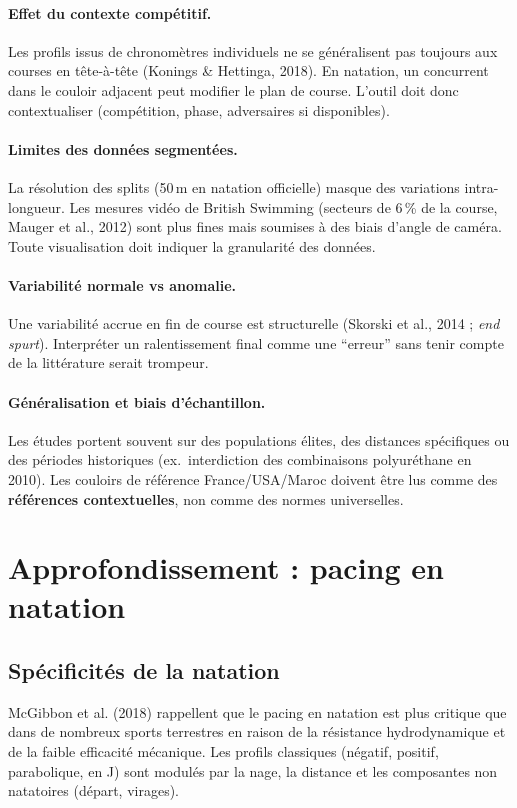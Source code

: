\documentclass[11pt,a4paper]{article}
\begin{document}
\paragraph{Effet du contexte compétitif.}
Les profils issus de chronomètres individuels ne se généralisent pas toujours aux courses en tête-à-tête (Konings \& Hettinga, 2018). En natation, un concurrent dans le couloir adjacent peut modifier le plan de course. L'outil doit donc contextualiser (compétition, phase, adversaires si disponibles).

\paragraph{Limites des données segmentées.}
La résolution des splits (50\,m en natation officielle) masque des variations intra-longueur. Les mesures vidéo de British Swimming (secteurs de 6\,\% de la course, Mauger et al., 2012) sont plus fines mais soumises à des biais d'angle de caméra. Toute visualisation doit indiquer la granularité des données.

\paragraph{Variabilité normale vs anomalie.}
Une variabilité accrue en fin de course est structurelle (Skorski et al., 2014 ; \textit{end spurt}). Interpréter un ralentissement final comme une ``erreur'' sans tenir compte de la littérature serait trompeur.

\paragraph{Généralisation et biais d'échantillon.}
Les études portent souvent sur des populations élites, des distances spécifiques ou des périodes historiques (ex.\ interdiction des combinaisons polyuréthane en 2010). Les couloirs de référence France/USA/Maroc doivent être lus comme des \textbf{références contextuelles}, non comme des normes universelles.

\section{Approfondissement : pacing en natation}

\subsection{Spécificités de la natation}
McGibbon et al. (2018) rappellent que le pacing en natation est plus critique que dans de nombreux sports terrestres en raison de la résistance hydrodynamique et de la faible efficacité mécanique. Les profils classiques (négatif, positif, parabolique, en J) sont modulés par la nage, la distance et les composantes non natatoires (départ, virages).
\end{document}
